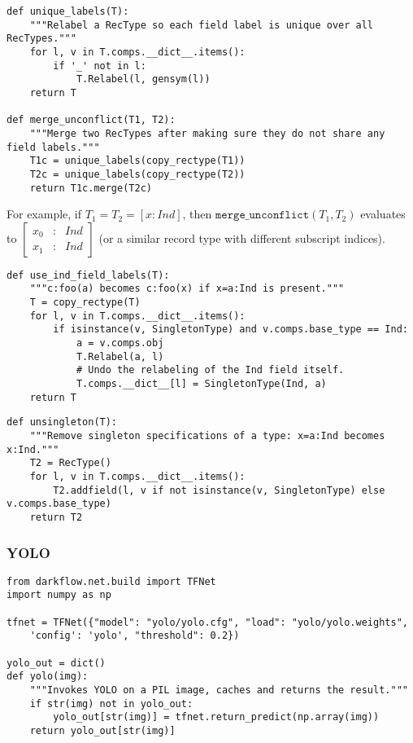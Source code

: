 \begin{lstlisting}[label={lst:mergeunconflict},caption={merge\_unconflict()}]
def unique_labels(T):
    """Relabel a RecType so each field label is unique over all RecTypes."""
    for l, v in T.comps.__dict__.items():
        if '_' not in l:
            T.Relabel(l, gensym(l))
    return T

def merge_unconflict(T1, T2):
    """Merge two RecTypes after making sure they do not share any field labels."""
    T1c = unique_labels(copy_rectype(T1))
    T2c = unique_labels(copy_rectype(T2))
    return T1c.merge(T2c)
\end{lstlisting}

For example, if $T_1 = T_2 = [x:Ind]$, then $\mathtt{merge\_unconflict}(T_1, T_2)$ evaluates to $\left[\begin{array}{rcl} x_0&:&Ind \\ x_1&:&Ind \end{array}\right]$ (or a similar record type with different subscript indices).

\begin{lstlisting}[label={lst:useindfieldlabels},caption={use\_ind\_field\_labels()}]
def use_ind_field_labels(T):
    """c:foo(a) becomes c:foo(x) if x=a:Ind is present."""
    T = copy_rectype(T)
    for l, v in T.comps.__dict__.items():
        if isinstance(v, SingletonType) and v.comps.base_type == Ind:
            a = v.comps.obj
            T.Relabel(a, l)
            # Undo the relabeling of the Ind field itself.
            T.comps.__dict__[l] = SingletonType(Ind, a)
    return T
\end{lstlisting}

\begin{lstlisting}[label={lst:unsingleton},caption={unsingleton()}]
def unsingleton(T):
    """Remove singleton specifications of a type: x=a:Ind becomes x:Ind."""
    T2 = RecType()
    for l, v in T.comps.__dict__.items():
        T2.addfield(l, v if not isinstance(v, SingletonType) else v.comps.base_type)
    return T2
\end{lstlisting}

\subsubsection{YOLO}

\begin{lstlisting}[label=lst:yolo, caption=Invoking YOLO]
from darkflow.net.build import TFNet
import numpy as np

tfnet = TFNet({"model": "yolo/yolo.cfg", "load": "yolo/yolo.weights",
    'config': 'yolo', "threshold": 0.2})

yolo_out = dict()
def yolo(img):
    """Invokes YOLO on a PIL image, caches and returns the result."""
    if str(img) not in yolo_out:
        yolo_out[str(img)] = tfnet.return_predict(np.array(img))
    return yolo_out[str(img)]
\end{lstlisting}

